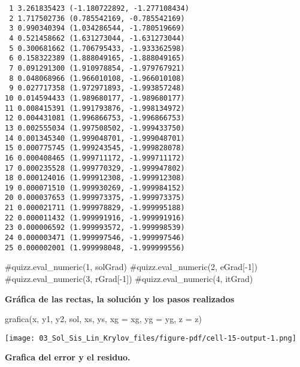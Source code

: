 \documentclass[
  letterpaper,
  DIV=11,
  numbers=noendperiod]{scrreprt}
\newenvironment{Shaded}{\begin{snugshade}}{\end{snugshade}}
\newcommand{\CommentTok}[1]{\textcolor[rgb]{0.37,0.37,0.37}{#1}}
\newcommand{\NormalTok}[1]{\textcolor[rgb]{0.00,0.23,0.31}{#1}}
\newcommand{\OperatorTok}[1]{\textcolor[rgb]{0.37,0.37,0.37}{#1}}
\begin{document}
\begin{verbatim}
 1 3.261835423 (-1.180722892, -1.277108434)
 2 1.717502736 (0.785542169, -0.785542169)
 3 0.990340394 (1.034286544, -1.780519669)
 4 0.521458662 (1.631273044, -1.631273044)
 5 0.300681662 (1.706795433, -1.933362598)
 6 0.158322389 (1.888049165, -1.888049165)
 7 0.091291300 (1.910978854, -1.979767921)
 8 0.048068966 (1.966010108, -1.966010108)
 9 0.027717358 (1.972971893, -1.993857248)
10 0.014594433 (1.989680177, -1.989680177)
11 0.008415391 (1.991793876, -1.998134972)
12 0.004431081 (1.996866753, -1.996866753)
13 0.002555034 (1.997508502, -1.999433750)
14 0.001345340 (1.999048701, -1.999048701)
15 0.000775745 (1.999243545, -1.999828078)
16 0.000408465 (1.999711172, -1.999711172)
17 0.000235528 (1.999770329, -1.999947802)
18 0.000124016 (1.999912308, -1.999912308)
19 0.000071510 (1.999930269, -1.999984152)
20 0.000037653 (1.999973375, -1.999973375)
21 0.000021711 (1.999978829, -1.999995188)
22 0.000011432 (1.999991916, -1.999991916)
23 0.000006592 (1.999993572, -1.999998539)
24 0.000003471 (1.999997546, -1.999997546)
25 0.000002001 (1.999998048, -1.999999556)
\end{verbatim}

\begin{Shaded}
\begin{Highlighting}[]
\CommentTok{\#quizz.eval\_numeric(\textquotesingle{}1\textquotesingle{}, solGrad)}
\CommentTok{\#quizz.eval\_numeric(\textquotesingle{}2\textquotesingle{}, eGrad[{-}1])}
\CommentTok{\#quizz.eval\_numeric(\textquotesingle{}3\textquotesingle{}, rGrad[{-}1])}
\CommentTok{\#quizz.eval\_numeric(\textquotesingle{}4\textquotesingle{}, itGrad)}
\end{Highlighting}
\end{Shaded}

\textbf{Gráfica de las rectas, la solución y los pasos realizados}

\begin{Shaded}
\begin{Highlighting}[]
\NormalTok{grafica(x, y1, y2, sol, xs, ys, xg }\OperatorTok{=}\NormalTok{ xg, yg }\OperatorTok{=}\NormalTok{ yg, z }\OperatorTok{=}\NormalTok{ z)}
\end{Highlighting}
\end{Shaded}

\texttt{[image: 03\_Sol\_Sis\_Lin\_Krylov\_files/figure-pdf/cell-15-output-1.png]}

\textbf{Grafica del error y el residuo.}
\end{document}
